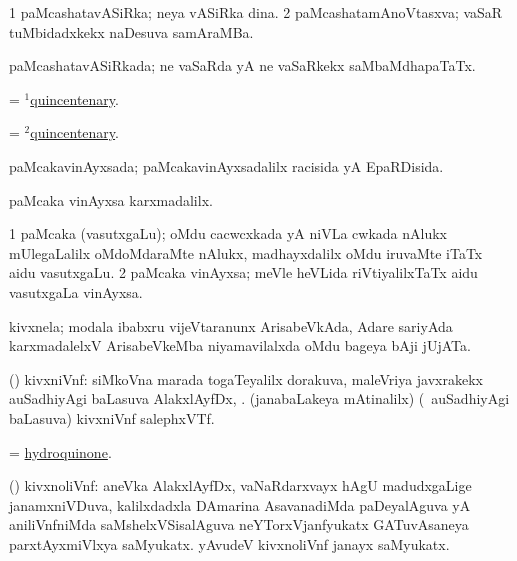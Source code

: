 \bentry
{}
\gl{\nA}
\bmng
\bnum
\num{1} paMcashatavASiRka; neya vASiRka dina. 
\num{2} paMcashatamAnoVtasxva;  vaSaR tuMbidadxkekx naDesuva samAraMBa. 
\enum
\emng
\eentry


\bentry
{}
\gl{\gu}
\bmng
paMcashatavASiRkada; ne vaSaRda yA ne vaSaRkekx saMbaMdhapaTaTx. 
\emng
\eentry


\bentry
{}
\gl{\nA}
\bmng
= \hyperlink{quincentenary(1)}{$^1$quincentenary}. 
\emng
\eentry

\bentry
{}
\gl{\gu}
\expl{}
\bmng
= \hyperlink{quincentenary(2)}{$^2$quincentenary}. 
\emng
\eentry

\bentry
{}
\gl{\gu}
\expl{}
\bmng
paMcakavinAyxsada; paMcakavinAyxsadalilx racisida yA EpaRDisida. 
\emng
\eentry

\bentry
{}
\gl{\kirxvi}
\bmng
paMcaka vinAyxsa karxmadalilx. 
\emng
\eentry

\bentry
{}
\gl{\nA}
\bmng
\bnum
\num{1} paMcaka (vasutxgaLu); oMdu cacwcxkada yA niVLa cwkada nAlukx mUlegaLalilx oMdoMdaraMte nAlukx, madhayxdalilx oMdu iruvaMte iTaTx aidu vasutxgaLu. 
\num{2} paMcaka vinAyxsa; meVle heVLida riVtiyalilxTaTx aidu vasutxgaLa vinAyxsa. 
\enum
\emng
\eentry

\bentry
{}
\gl{\nA}
\bmng
kivxnela; modala ibabxru vijeVtaranunx ArisabeVkAda, Adare sariyAda karxmadalelxV ArisabeVkeMba niyamavilalxda oMdu bageya bAji jUjATa. 
\emng
\eentry

\bentry
{}
\gl{\nA}
\expl{}
\bmng
(\ravi) kivxniVnf: 
\banum
{} siMkoVna marada togaTeyalilx dorakuva, maleVriya javxrakekx auSadhiyAgi baLasuva AlakxlAyfDx, . 
 (janabaLakeya mAtinalilx) (\sA\ auSadhiyAgi baLasuva) kivxniVnf salephxVTf. 
\eanum
\emng
\eentry

\bentry
{}
\gl{\nA}
\bmng
= \hyperref{kandict_h.pdf}{H}{hydroquinone}{hydroquinone}. 
\emng
\eentry

\bentry
{}
\gl{\nA}
\bmng
(\ravi) kivxnoliVnf: 
\banum
{} aneVka AlakxlAyfDx, vaNaRdarxvayx hAgU madudxgaLige janamxniVDuva, kalilxdadxla DAmarina AsavanadiMda paDeyalAguva yA aniliVnfniMda saMshelxVSisalAguva neYTorxVjanfyukatx GATuvAsaneya parxtAyxmiVlxya saMyukatx. 
 yAvudeV kivxnoliVnf janayx saMyukatx. 
\eanum
\emng
\eentry

